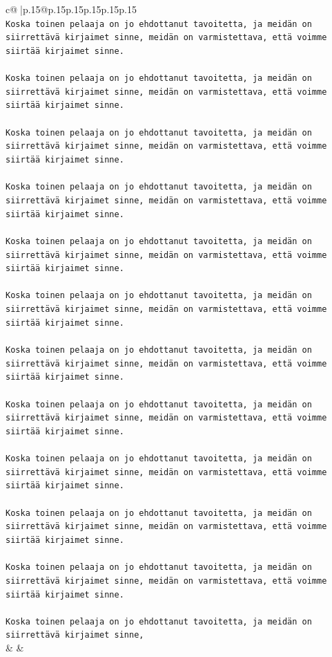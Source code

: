\documentclass{article}
\begin{document}
{\begin{supertabular}{c@{$\;$}|p{.15\linewidth}@{}p{.15\linewidth}p{.15\linewidth}p{.15\linewidth}p{.15\linewidth}p{.15\linewidth}}
{{{\\ 
\texttt{Koska toinen pelaaja on jo ehdottanut tavoitetta, ja meidän on siirrettävä kirjaimet sinne, meidän on varmistettava, että voimme siirtää kirjaimet sinne.} \\
\\ 
\texttt{Koska toinen pelaaja on jo ehdottanut tavoitetta, ja meidän on siirrettävä kirjaimet sinne, meidän on varmistettava, että voimme siirtää kirjaimet sinne.} \\
\\ 
\texttt{Koska toinen pelaaja on jo ehdottanut tavoitetta, ja meidän on siirrettävä kirjaimet sinne, meidän on varmistettava, että voimme siirtää kirjaimet sinne.} \\
\\ 
\texttt{Koska toinen pelaaja on jo ehdottanut tavoitetta, ja meidän on siirrettävä kirjaimet sinne, meidän on varmistettava, että voimme siirtää kirjaimet sinne.} \\
\\ 
\texttt{Koska toinen pelaaja on jo ehdottanut tavoitetta, ja meidän on siirrettävä kirjaimet sinne, meidän on varmistettava, että voimme siirtää kirjaimet sinne.} \\
\\ 
\texttt{Koska toinen pelaaja on jo ehdottanut tavoitetta, ja meidän on siirrettävä kirjaimet sinne, meidän on varmistettava, että voimme siirtää kirjaimet sinne.} \\
\\ 
\texttt{Koska toinen pelaaja on jo ehdottanut tavoitetta, ja meidän on siirrettävä kirjaimet sinne, meidän on varmistettava, että voimme siirtää kirjaimet sinne.} \\
\\ 
\texttt{Koska toinen pelaaja on jo ehdottanut tavoitetta, ja meidän on siirrettävä kirjaimet sinne, meidän on varmistettava, että voimme siirtää kirjaimet sinne.} \\
\\ 
\texttt{Koska toinen pelaaja on jo ehdottanut tavoitetta, ja meidän on siirrettävä kirjaimet sinne, meidän on varmistettava, että voimme siirtää kirjaimet sinne.} \\
\\ 
\texttt{Koska toinen pelaaja on jo ehdottanut tavoitetta, ja meidän on siirrettävä kirjaimet sinne, meidän on varmistettava, että voimme siirtää kirjaimet sinne.} \\
\\ 
\texttt{Koska toinen pelaaja on jo ehdottanut tavoitetta, ja meidän on siirrettävä kirjaimet sinne, meidän on varmistettava, että voimme siirtää kirjaimet sinne.} \\
\\ 
\texttt{Koska toinen pelaaja on jo ehdottanut tavoitetta, ja meidän on siirrettävä kirjaimet sinne,} \\
            }
        }
    }
    & & \\ \\


\end{supertabular}}
\end{document}

